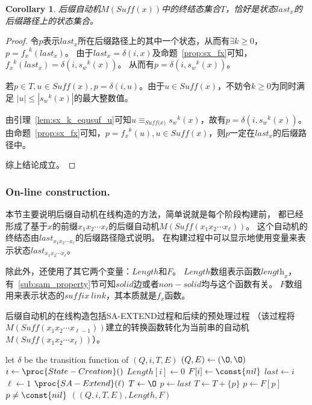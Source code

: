 \documentclass[UTF8]{ctexart}
\newtheorem{cor}[thm]{Corollary}
\theoremstyle{definition}
\theoremstyle{remark}
\numberwithin{equation}{subsection}
\newcommand{\equsuf}[1][x]{\equiv_{\textit{Suff(#1)}}}
\newcommand{\Suff}{\textit{Suff}}
\newcommand{\len}[1][x]{\textit{length}_{#1}}
\begin{document}
	\begin{cor}
	\label{cor:sam_t_lastx}
		后缀自动机$M(\Suff(x))$中的终结态集合$T$，恰好是状态$last_x$的后缀路径上的状态集合。
	\end{cor}
	\begin{proof}
		令$p$表示$last_x$所在后缀路径上的其中一个状态，从而有$\exists k \ge 0$，$p = {f_x}^k(last_x)$。
		由于$last_x = \delta(i, x)$及命题~\ref{prop:sx_fx}可知，${f_x}^k(last_x) = \delta(i, {s_w}^k(x))$。
		从而有$p = \delta(i, {s_w}^k(x))$。
		
		若$p \in T, u \in \Suff(x), p = \delta(i, u)$。由于$u \in \Suff(x)$，不妨令$k \ge 0$为同时满足
		$|u| \le |{s_w}^k(x)|$的最大整数值。
		
		由引理~\ref{lem:sx_k_equsuf_u}可知$u \equsuf[x] {s_w}^k(x)$，故有$p = \delta(i, {s_w}^k(x))$。
		由命题~\ref{prop:sx_fx}可知，$p = {f_x}^k(u), u \in \Suff(x)$，则$p$一定在$last_x$的后缀路径中。
		
		综上结论成立。
	\end{proof}
	
\subsubsection{On-line construction.}
\label{subsub:sam_online_construct}

	本节主要说明后缀自动机在线构造的方法，简单说就是每个阶段构建前，
	都已经形成了基于$x$的前缀$x_1 x_2 \cdots x_{\ell}$的后缀自动机$M(\Suff(x_1 x_2 \cdots x_{\ell}))$。
	这个自动机的终结态由$last_{x_1 x_2 \cdots x_{\ell}}$的后缀路径隐式说明。
	在构建过程中可以显示地使用变量来表示状态$last_{x_1 x_2 \cdots x_{\ell}}$。
	
	除此外，还使用了其它两个变量：$Length$和$F$。
	$Length$数组表示函数$\len[x]$，有~\ref{sub:sam_property}节可知$solid$边或者$non-solid$均与这个函数有关。
	$F$数组用来表示状态的$suffix\ link$，其本质就是$f_x$函数。
	
	后缀自动机的在线构造包括SA-EXTEND过程和后续的预处理过程
	（该过程将$M(\Suff(x_1 x_2 \cdots x_{\ell-1}))$建立的转换函数转化为当前串的自动机$M(\Suff(x_1 x_2 \cdots x_{\ell}))$）。
	\begin{codebox}
		\zi let $\delta$ be the transition function of $(Q, i, T, E)$
		\li $(Q, E) \gets ({\O}, {\O})$
		\li $i \gets \proc{State-Creation}()$
		\li $Length[i] \gets 0$
		\li $F[i] \gets \const{nil}$
		\li $last \gets i$
		\li \For $\ell \gets 1$ \To {}
		\li		\Do $\proc{SA-Extend}(\ell)$
				\End
		\li	$T \gets {\O}$
		\li	$p \gets last$
		\li {}
        \li     \Do
				$T \gets T + \{p\}$
		\li		$p \gets F[p]$
                \End
		\li	{} $p \neq \const{nil}$
		\li \Return $((Q, i, T, E), Length, F)$
	\end{codebox}
	
\end{document}
